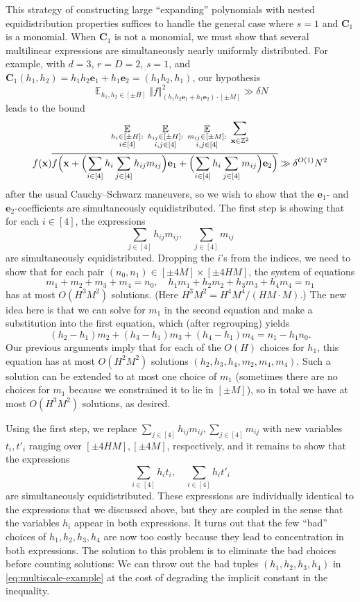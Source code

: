 \documentclass[11pt]{amsart}
\theoremstyle{definition}
\DeclareMathOperator*{\E}{\mathbb{E}}
\newcommand{\bc}{{\mathbf{C}}}
\newcommand{\be}{{\mathbf{e}}}
\newcommand{\bx}{{\mathbf{x}}}
\newcommand{\norm}[1]{\left\Vert #1\right\Vert}
\newcommand{\Bigbrac}[1]{\Bigl( #1 \Bigr)}
\begin{document}
This strategy of constructing large ``expanding'' polynomials with nested equidistribution properties suffices to handle the general case where $s=1$ and $\bc_1$ is a monomial.  When $\bc_1$ is not a monomial, we must show that several multilinear expressions are simultaneously nearly uniformly distributed.  For example, with $d=3$, $r=D=2$, $s=1$, and $\bc_1(h_1,h_2)=h_1h_2 \be_1+h_1 \be_2=(h_1h_2,h_1)$, our hypothesis
$$\E_{h_1,h_2 \in [\pm H]} \norm{f}^2_{(h_1h_2 \be_1+h_1 \be_2) \cdot [\pm M]} \gg \delta N$$
leads to the bound
\begin{multline}\label{eq:multiscale-example}
\E_{\substack{h_{i} \in [\pm H]:\\ i \in [4]}}\; \E_{\substack{h_{ij}\in [\pm H]:\\ i,j \in [4]}}\;\E_{\substack{m_{ij} \in [\pm M]:\\ i,j \in [4]}}\;\sum_{\bx \in \mathbb{Z}^2}\\
f(\bx) \overline{f\Bigbrac{\bx+\Bigbrac{\sum_{i \in [4]}h_i \sum_{j \in [4]}h_{ij}m_{ij} }\be_1+\Bigbrac{\sum_{i \in [4]}h_i \sum_{j \in [4]}m_{ij}}\be_2}}\gg \delta^{O(1)} N^2
\end{multline}
after the usual Cauchy--Schwarz maneuvers, so we wish to show that the $\be_1$- and $\be_2$-coefficients are simultaneously equidistributed.  The first step is showing that for each $i \in [4]$, the expressions
$$\sum_{j \in [4]}h_{ij}m_{ij}, \quad \sum_{j \in [4]}m_{ij}$$
are simultaneously equidistributed.  Dropping the $i$'s from the indices, we need to show that for each pair $(n_0,n_1) \in [\pm 4M]\times [\pm 4HM]$, the system of equations
$$ m_1+m_2+m_3+m_4=n_0,\quad h_1m_1+h_2m_2+h_3m_3+h_4m_4=n_1$$
has at most $O(H^3M^2)$ solutions.  (Here $H^3M^2=H^4M^4/(H M \cdot M)$.)  The new idea here is that we can solve for $m_1$ in the second equation and make a substitution into the first equation, which (after regrouping) yields
$$(h_2-h_1)m_2+(h_3-h_1)m_3+(h_4-h_1)m_4=n_1-h_1n_0.$$
Our previous arguments imply that for each of the $O(H)$ choices for $h_1$, this equation has at most $O(H^2M^2)$ solutions $(h_2,h_3,h_4,m_2,m_4,m_4)$.  Such a solution can be extended to at most one choice of $m_1$ (sometimes there are no choices for $m_1$ because we constrained it to lie in $[\pm M]$), so in total we have at most $O(H^3M^2)$ solutions, as desired.

Using the first step, we replace $\sum_{j \in [4]}h_{ij}m_{ij}, \sum_{j \in [4]}m_{ij}$ with new variables $t_i,t'_i$ ranging over $[\pm 4HM], [\pm 4M]$, respectively, and it remains to show that the expressions
$$\sum_{i \in [4]} h_i t_i, \quad \sum_{i \in [4]} h_i t'_i$$
are simultaneously equidistributed.  These expressions are individually identical to the expressions that we discussed above, but they are coupled in the sense that the variables $h_i$ appear in both expressions.  It turns out that the few ``bad'' choices of $h_1,h_2,h_3,h_4$ are now too costly because they lead to concentration in both expressions.  The solution to this problem is to eliminate the bad choices before counting solutions: We can throw out the bad tuples $(h_1,h_2,h_3,h_4)$ in \eqref{eq:multiscale-example} at the cost of degrading the implicit constant in the inequality.
\end{document}
